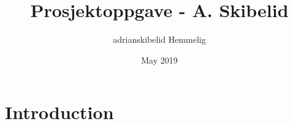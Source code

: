 \documentclass{article}
\title{Prosjektoppgave - A. Skibelid}
\author{adrianskibelid Hemmelig}
\date{May 2019}
\begin{document}
\maketitle

\section{Introduction}
\end{document}
